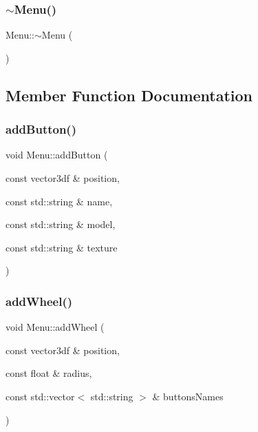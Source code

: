 \mbox{\label{class_menu_a831387f51358cfb88cd018e1777bc980}} 
\subsubsection{\texorpdfstring{$\sim$Menu()}{~Menu()}}
{\footnotesize\ttfamily Menu\+::$\sim$\+Menu (\begin{DoxyParamCaption}{ }\end{DoxyParamCaption})}



\subsection{Member Function Documentation}
\mbox{\label{class_menu_a1b9e0149e9112ee9a8d60e65bc5dcbfa}} 
\subsubsection{\texorpdfstring{addButton()}{addButton()}}
{\footnotesize\ttfamily void Menu\+::add\+Button (\begin{DoxyParamCaption}\item[{const vector3df \&}]{position,  }\item[{const std\+::string \&}]{name,  }\item[{const std\+::string \&}]{model,  }\item[{const std\+::string \&}]{texture }\end{DoxyParamCaption})}

\mbox{\label{class_menu_a367dc9b5e8662346cfa853c91e17ee3b}} 
\subsubsection{\texorpdfstring{addWheel()}{addWheel()}\hspace{0.1cm}{\footnotesize\ttfamily [1/2]}}
{\footnotesize\ttfamily void Menu\+::add\+Wheel (\begin{DoxyParamCaption}\item[{const vector3df \&}]{position,  }\item[{const float \&}]{radius,  }\item[{const std\+::vector$<$ std\+::string $>$ \&}]{buttons\+Names }\end{DoxyParamCaption})}


